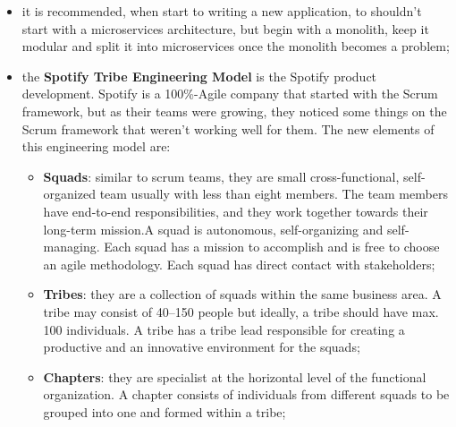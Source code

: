 \documentclass[oneside]{article}
\begin{document}
\begin{itemize}
    \item it is recommended, when start to writing a new application, to shouldn't start with a microservices architecture, but begin with a monolith, keep it modular and split it into microservices once the monolith becomes a problem;
    
    \begin{figure}[!htb]
    \end{figure}
    
    \item the \textbf{Spotify Tribe Engineering Model} is the Spotify product development. Spotify is a 100\%-Agile company that started with the Scrum framework, but as their teams were growing, they noticed some things on the Scrum framework that weren’t working well for them. The new elements of this engineering model are:
        \begin{itemize}
            \item \textbf{Squads}: similar to scrum teams, they are small cross-functional, self-organized team usually with less than eight members. The team members have end-to-end responsibilities, and they work together towards their long-term mission.A squad is autonomous, self-organizing and self-managing. Each squad has a mission to accomplish and is free to choose an agile methodology. Each squad has direct contact with stakeholders;
            
            \item \textbf{Tribes}: they are a collection of squads within the same business area. A tribe may consist of 40–150 people but ideally, a tribe should have max. 100 individuals. A tribe has a tribe lead responsible for creating a productive and an innovative environment for the squads;
            
            \item \textbf{Chapters}: they are specialist at the horizontal level of the functional organization. A chapter consists of individuals from different squads to be grouped into one and formed within a tribe;
            

\end{itemize}
\end{itemize}
\end{document}
